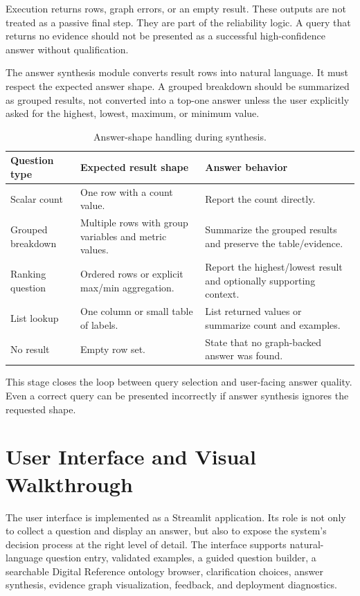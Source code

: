 \documentclass[
  12pt,
  english,
  oneside]{report}
\begin{document}
Execution returns rows, graph errors, or an empty result. These outputs are not treated as a passive final step. They are part of the reliability logic. A query that returns no evidence should not be presented as a successful high-confidence answer without qualification.

The answer synthesis module converts result rows into natural language. It must respect the expected answer shape. A grouped breakdown should be summarized as grouped results, not converted into a top-one answer unless the user explicitly asked for the highest, lowest, maximum, or minimum value.

\begin{table}[htbp]
\centering
\caption{Answer-shape handling during synthesis.}
\label{tab:answer-shape-synthesis}
\begin{tabularx}{\textwidth}{
>{\raggedright\arraybackslash}p{3.2cm}
>{\raggedright\arraybackslash}p{4.5cm}
>{\raggedright\arraybackslash}X
}
\toprule
\textbf{Question type} & \textbf{Expected result shape} & \textbf{Answer behavior} \\
\midrule
Scalar count & One row with a count value. & Report the count directly. \\
Grouped breakdown & Multiple rows with group variables and metric values. & Summarize the grouped results and preserve the table/evidence. \\
Ranking question & Ordered rows or explicit max/min aggregation. & Report the highest/lowest result and optionally supporting context. \\
List lookup & One column or small table of labels. & List returned values or summarize count and examples. \\
No result & Empty row set. & State that no graph-backed answer was found. \\
\bottomrule
\end{tabularx}
\end{table}

This stage closes the loop between query selection and user-facing answer quality. Even a correct query can be presented incorrectly if answer synthesis ignores the requested shape.

\section{User Interface and Visual Walkthrough}
\label{sec:user-interface}

The user interface is implemented as a Streamlit application. Its role is not only to collect a question and display an answer, but also to expose the system's decision process at the right level of detail. The interface supports natural-language question entry, validated examples, a guided question builder, a searchable Digital Reference ontology browser, clarification choices, answer synthesis, evidence graph visualization, feedback, and deployment diagnostics.
\end{document}
